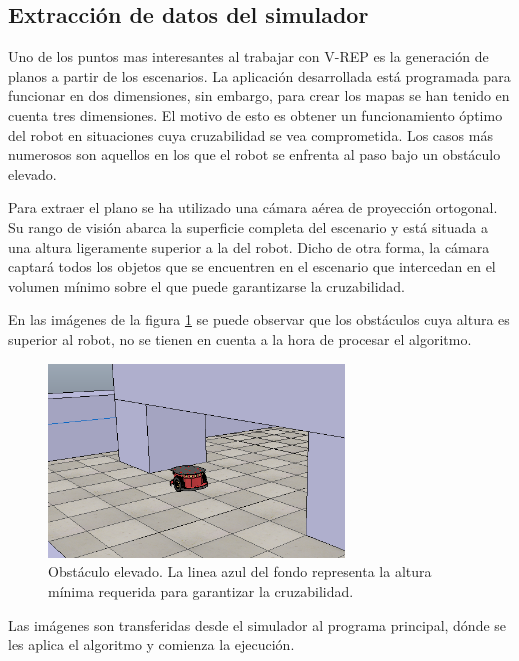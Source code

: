 \subsection{Extracción de datos del simulador}

Uno de los puntos mas interesantes al trabajar con V-REP es la generación de planos a partir de los escenarios. La aplicación desarrollada está programada para funcionar en dos dimensiones, sin embargo, para crear los mapas se han tenido en cuenta tres dimensiones. El motivo de esto es obtener un funcionamiento óptimo del robot en situaciones cuya cruzabilidad se vea comprometida. Los casos más numerosos son aquellos en los que el robot se enfrenta al paso bajo un obstáculo elevado. 

Para extraer el plano se ha utilizado una cámara aérea de proyección ortogonal. Su rango de visión abarca la superficie completa del escenario y está situada a una altura ligeramente superior a la del robot. Dicho de otra forma, la cámara captará todos los objetos que se encuentren en el escenario que intercedan en el volumen mínimo sobre el que puede garantizarse la cruzabilidad.

En las imágenes de la figura \ref{fig:tunel} se puede observar que los obstáculos cuya altura es superior al robot, no se tienen en cuenta a la hora de procesar el algoritmo.

	
\begin{figure}[h]
		\centering
        \includegraphics[width=0.7\textwidth]{images/tunel.png}
        \caption{Obstáculo elevado. La linea azul del fondo representa la altura mínima requerida para garantizar la cruzabilidad.}
        \label{fig:tunel}
\end{figure} 

Las imágenes son transferidas desde el simulador al programa principal, dónde se les aplica el algoritmo y comienza la ejecución.

